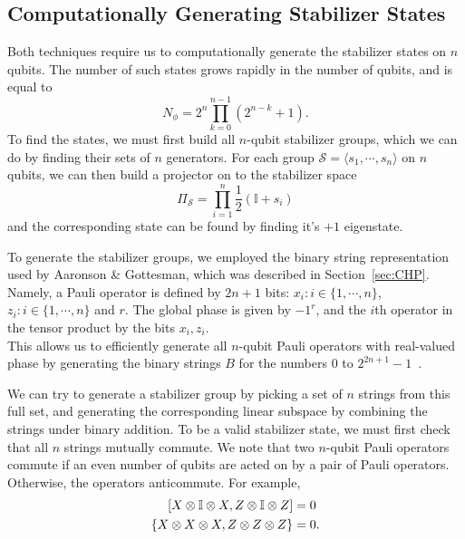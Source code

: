 \documentclass{standalone}
\begin{document}
\subsection{Computationally Generating Stabilizer States}
Both techniques require us to computationally generate the stabilizer states on $n$ qubits. The number of such states grows rapidly in the number of qubits, and is equal to~\cite{Aaronson2004a}
\begin{equation}\label{eq:nstabs}
    N_{\phi}=2^{n}\prod_{k=0}^{n-1}\left(2^{n-k}+1\right).
\end{equation}
To find the states, we must first build all $n$-qubit stabilizer groups, which we can do by finding their sets of $n$ generators. For each group $\mathcal{S}=\langle s_{1},\cdots,s_{n}\rangle$ on $n$ qubits, we can then build a projector on to the stabilizer space~\cite{Gottesman1997}
\begin{equation}\label{eq:stabproj}
    \Pi_{\mathcal{S}} = \prod_{i=1}^{n} \frac{1}{2}\left(\mathbb{I}+s_{i}\right)
\end{equation}
and the corresponding state can be found by finding it's $+1$ eigenstate.
\par
To generate the stabilizer groups, we employed the binary string representation used by Aaronson \& Gottesman, which was described in Section~\ref{sec:CHP}. Namely, a Pauli operator is defined by $2n+1$ bits: $x_{i}:i\in\{1,\cdots,n\}$, $z_{i}:i\in\{1,\cdots,n\}$ and $r$. The global phase is given by $-1^{r}$, and the $i$th operator in the tensor product by the bits $x_{i},z_{i}$. \\
This allows us to efficiently generate all $n$-qubit Pauli operators with real-valued phase by generating the binary strings $B$ for the numbers $0$ to $2^{2n+1}-1$~\cite{Aaronson2004a}.\\
\par
We can try to generate a stabilizer group by picking a set of $n$ strings from this full set, and generating the corresponding linear subspace by combining the strings under binary addition. To be a valid stabilizer state, we must first check that all $n$ strings mutually commute. We note that two $n$-qubit Pauli operators commute if an even number of qubits are acted on by a pair of Pauli operators. Otherwise, the operators anticommute. For example, 
\begin{align*}
\comm{X\otimes\mathbb{I}\otimes X}{Z\otimes\mathbb{I}\otimes Z}&= 0\\
\acomm{X\otimes X\otimes X}{Z\otimes Z\otimes Z} &= 0. \\
\end{align*}
\end{document}
